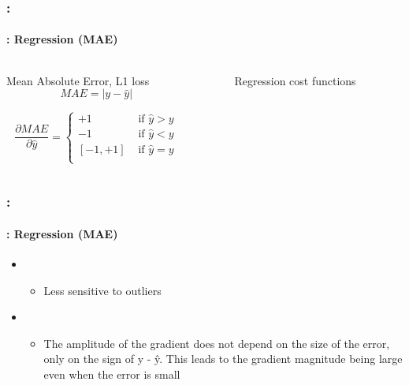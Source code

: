 \documentclass[xcolor=table]{beamer}
\begin{document}
\begin{frame}
	\frametitle{\insertshortsubtitle: \insertsection}
	\framesubtitle{\insertsubsection: Regression (MAE)}
	
	\begin{columns}
		\begin{column}{.68\linewidth}
			\begin{block}{Mean Absolute Error, L1 loss}
				\[MAE = |y - \hat{y}|\]
				
				\[
				\frac{\partial MAE}{\partial \hat{y}} = 
				\begin{cases}
					+1 & \text{ if } \hat{y} > y \\
					-1 & \text{ if } \hat{y} < y \\
					[-1, +1] & \text{ if } \hat{y} = y \\
				\end{cases}
				\]
			\end{block}
		\end{column}%
		\begin{column}{.3\linewidth}
			\begin{figure}
				\caption{Regression cost functions \cite{2017-rosenberg}}
			\end{figure}
		\end{column}
	\end{columns}

\end{frame}

\begin{frame}
	\frametitle{\insertshortsubtitle: \insertsection}
	\framesubtitle{\insertsubsection: Regression (MAE)}
	
	\begin{itemize}
		\item {}
		\begin{itemize}
			\item Less sensitive to outliers
		\end{itemize}
		\item {}
		\begin{itemize}
			\item The amplitude of the gradient does not depend on the size of the error, only on the sign of y - ŷ. This leads to the gradient magnitude being large even when the error is small
		\end{itemize}
	\end{itemize}

\end{frame}
\end{document}
